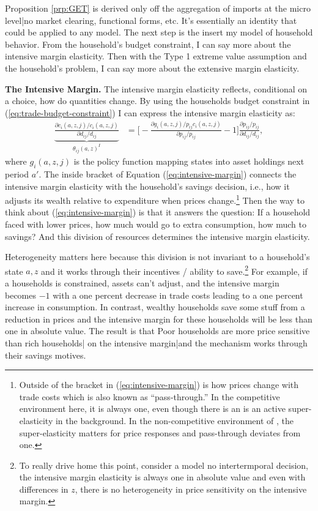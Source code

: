 \documentclass[12pt,pdftex]{article}
\begin{document}
\begin{onehalfspacing}
Proposition \ref{prp:GET} is derived only off the aggregation of imports at the micro level|no market clearing, functional forms, etc. It's essentially an identity that could be applied to any model. The next step is the insert my model of household behavior. From the household's budget constraint, I can say more about the intensive margin elasticity. Then with the Type 1 extreme value assumption and the household's problem, I can say more about the extensive margin elasticity.

\textbf{The Intensive Margin.} The intensive margin elasticity reflects, conditional on a choice, how do quantities change. By using the households budget constraint in (\ref{eq:trade-budget-constraint}) I can express the intensive margin elasticity as:
\begin{align}
\underbrace{\frac{\partial c_{i}(a,z,j)/ c_{i}(a,z,j)}{\partial d_{ij} / d_{ij}}}_{\theta_{ij}(a,z)^{I}} &= \bigg [-\frac{\partial g_{i}(a,z,j)/ p_{ij}c_{i}(a,z,j)}{\partial p_{ij}/ p_{ij}} - 1 \bigg ]\frac{\partial p_{ij}/p_{ij}}{\partial d_{ij}/ d_{ij}} ,
\label{eq:intensive-margin}
\end{align}
where $g_{i}(a,z,j)$ is the policy function mapping states into asset holdings next period $a'$. The inside bracket of Equation (\ref{eq:intensive-margin}) connects the intensive margin elasticity with the household's savings decision, i.e., how it adjusts its wealth relative to expenditure when prices change.\footnote{Outside of the bracket in (\ref{eq:intensive-margin}) is how prices change with trade costs which is also known as ``pass-through.'' In the competitive environment here, it is always one, even though there is an is an active super-elasticity in the background. In the non-competitive environment of \citet{p-iq}, the super-elasticity matters for price responses and pass-through deviates from one.} Then the way to think about (\ref{eq:intensive-margin}) is that it answers the question: If a household faced with lower prices, how much would go to extra consumption, how much to savings? And this division of resources determines the intensive margin elasticity.

Heterogeneity matters here because this division is not invariant to a household's state $a, z$ and it works through their incentives / ability to save.\footnote{To really drive home this point, consider a model no intertermporal decision, the intensive margin elasticity is always one in absolute value and even with differences in $z$, there is no heterogeneity in price sensitivity on the intensive margin.} For example, if a households is constrained, assets can't adjust, and the intensive margin becomes $-1$ with a one percent decrease in trade costs leading to a one percent increase in consumption. In contrast, wealthy households save some stuff from a reduction in prices and the intensive margin for these households will be less than one in absolute value. The result is that Poor households are more price sensitive than rich households| on the intensive margin|and the mechanism works through their savings motives.


\end{onehalfspacing}
\end{document}
